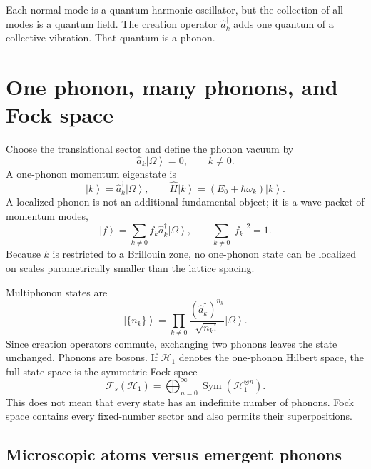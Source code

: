 \documentclass[11pt]{article}
\newcommand{\cH}{\mathcal{H}}
\newcommand{\cF}{\mathcal{F}}
\newcommand{\ket}[1]{\left|#1\right\rangle}
\begin{document}
\begin{keyidea}
Each normal mode is a quantum harmonic oscillator, but the collection of all
modes is a quantum field.  The creation operator $\hat a_k^\dagger$ adds one
quantum of a collective vibration.  That quantum is a phonon.
\end{keyidea}

\section{One phonon, many phonons, and Fock space}

Choose the translational sector and define the phonon vacuum by
\begin{equation}
  \hat a_k\ket{\Omega}=0,
  \qquad k\neq0.
  \label{eq:phononvacuum}
\end{equation}
A one-phonon momentum eigenstate is
\begin{equation}
  \ket{k}=\hat a_k^\dagger\ket{\Omega},
  \qquad
  \hat H\ket{k}=(E_0+\hbar\omega_k)\ket{k}.
  \label{eq:onephonon}
\end{equation}
A localized phonon is not an additional fundamental object; it is a wave
packet of momentum modes,
\begin{equation}
  \ket{f}
  =\sum_{k\neq0}f_k\hat a_k^\dagger\ket{\Omega},
  \qquad
  \sum_{k\neq0}|f_k|^2=1.
  \label{eq:wavepacket}
\end{equation}
Because $k$ is restricted to a Brillouin zone, no one-phonon state can be
localized on scales parametrically smaller than the lattice spacing.

Multiphonon states are
\begin{equation}
  \ket{\{n_k\}}
  =\prod_{k\neq0}
  \frac{(\hat a_k^\dagger)^{n_k}}{\sqrt{n_k!}}
  \ket{\Omega}.
  \label{eq:numberstates}
\end{equation}
Since creation operators commute, exchanging two phonons leaves the state
unchanged.  Phonons are bosons.  If $\cH_1$ denotes the one-phonon Hilbert
space, the full state space is the symmetric Fock space
\begin{equation}
  \cF_s(\cH_1)
  =\bigoplus_{n=0}^{\infty}
  \operatorname{Sym}\left(\cH_1^{\otimes n}\right).
  \label{eq:Fockphonon}
\end{equation}
This does not mean that every state has an indefinite number of phonons.
Fock space contains every fixed-number sector and also permits their
superpositions.

\subsection{Microscopic atoms versus emergent phonons}
\end{document}
